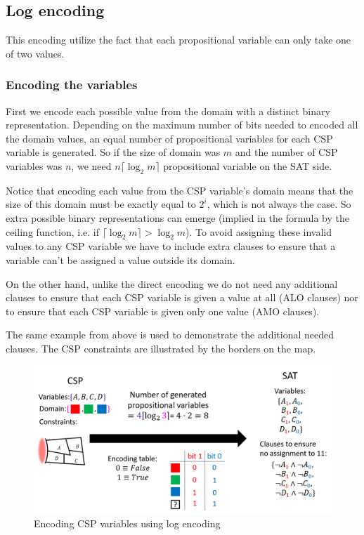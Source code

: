 \subsection{Log encoding}
This encoding utilize the fact that each propositional variable can only take one of two values.

\subsubsection{Encoding the variables}
First we encode each possible value from the domain with a distinct binary representation. Depending on the maximum number of bits needed to encoded all the domain values, an equal number of propositional variables for each CSP variable is generated. So if the size of domain was $m$ and the number of CSP variables was $n$, we need $n \lceil \log_2 m \rceil$ propositional variable on the SAT side.

Notice that encoding each value from the CSP variable's domain means that the size of this domain must be exactly equal to $2^i$, which is not always the case. So extra possible binary representations can emerge (implied in the formula by the ceiling function, i.e. if $ \lceil \log_2 m \rceil > \log_2 m $). To avoid assigning these invalid values to any CSP variable we have to include extra clauses to ensure that a variable can't be assigned a value outside its domain. 

On the other hand, unlike the direct encoding we do not need any additional clauses to ensure that each CSP variable is given a value at all (ALO clauses) nor to ensure that each CSP variable is given only one value (AMO clauses).

The same example from above is used to demonstrate the additional needed clauses. The CSP constraints are illustrated by the borders on the map.

\begin{figure}[H]
	\centering
	\includegraphics[width=0.85\linewidth]{assets/log_variables}
	\captionsetup{justification=centering,margin=2cm}
	\caption{Encoding CSP variables using log encoding}
	\label{fig:log_variables}
\end{figure}

